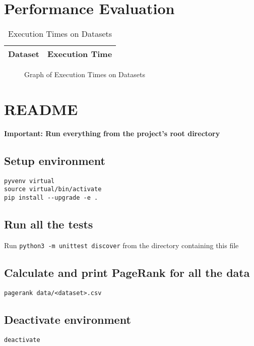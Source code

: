 \documentclass{report}
\begin{document}
\section{Performance Evaluation}
\begin{table}
  \centering
  \begin{tabular}{}
    \toprule
    Dataset & Execution Time\\
    \midrule
    \bottomrule
  \end{tabular}
  \caption{Execution Times on Datasets}
  \label{execution-times-table}
\end{table}
\begin{figure}
  \centering
  
  \caption{Graph of Execution Times on Datasets}
  \label{execution-times-graph}
\end{figure}
\appendix
\section{README}
\lstset{lang=bash}
\textbf{Important: Run everything from the project's root directory}

\subsection{Setup environment}
\begin{lstlisting}
pyvenv virtual
source virtual/bin/activate
pip install --upgrade -e .
\end{lstlisting}

\subsection{Run all the tests}
Run \verb+python3 -m unittest discover+ from the directory containing
this file

\subsection{Calculate and print PageRank for all the data}
\begin{lstlisting}
pagerank data/<dataset>.csv
\end{lstlisting}

\subsection{Deactivate environment}
\begin{lstlisting}
deactivate
\end{lstlisting}
\end{document}
